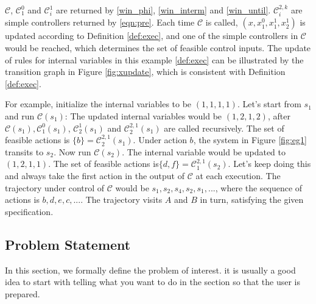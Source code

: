 \begin{example}
	$ \mathcal{C} $, $ \mathcal{C}_1^0 $ and $ \mathcal{C}_i^1 $ are returned by \eqref{win_phi}, \eqref{win_interm} and \eqref{win_until}. $ \mathcal{C}_i^{2,k} $ are simple controllers returned by \eqref{eqn:pre}. Each time $ \mathcal{C} $ is called, $ (x,x^0_1,x^1_1,x^1_2) $ is updated according to Definition \ref{def:exec}, and one of the simple controllers in $ \mathcal{C} $ would be reached, which determines the set of feasible control inputs. The update of rules for internal variables in this example \ref{def:exec} can be illustrated by the transition graph in Figure \ref{fig:xupdate}, which is consistent with Definition \ref{def:exec}. %
	
	For example, initialize the internal variables to be $ (1,1,1,1) $. Let's start from $ s_1 $ and run $ \mathcal{C}(s_1) $: The updated internal variables would be $ (1,2,1,2) $, after $ \mathcal{C}(s_1), \mathcal{C}^0_1(s_1)$, $ \mathcal{C}^1_2(s_1) $ and $ \mathcal{C}^{2,1}_2(s_1) $ are called recursively. The set of feasible actions is $ \{b\}= \mathcal{C}^{2,1}_2(s_1) $. Under action $ b $, the system in Figure \ref{fig:eg1} transits to $ s_2 $. Now run $ \mathcal{C}(s_2) $. The internal variable would be updated to $ (1,2,1,1) $. The set of feasible actions is$ \{d,f\}=\mathcal{C}^{2,1}_1(s_2) $. Let's keep doing this and always take the first action in the output of $ \mathcal{C} $ at each execution. The trajectory under control of $\mathcal{C} $ would be $ s_1,s_2,s_4,s_2,s_1,...$, where the sequence of actions is $ b,d,e,c,... $. The trajectory visits $ A $ and $ B $ in turn, satisfying the given specification.
	
\end{example}


\subsection{Problem Statement}

In this section, we formally define the problem of interest. {\color{blue}it is usually a good idea to start with telling what you want to do in the section so that the user is prepared.}


